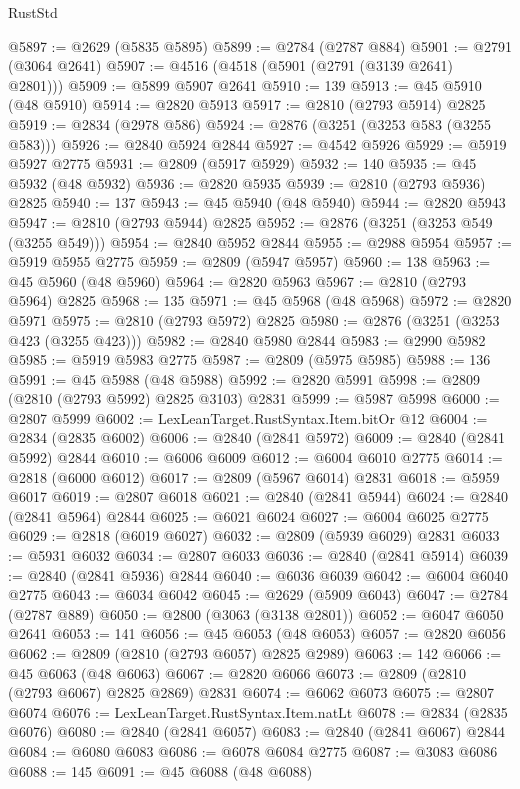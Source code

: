 \begin{lexlean}{RustStd}
\begin{coremodule}
@5897 := @2629 (@5835 @5895)
@5899 := @2784 (@2787 @884)
@5901 := @2791 (@3064 @2641)
@5907 := @4516 (@4518 (@5901 (@2791 (@3139 @2641) @2801)))
@5909 := @5899 @5907 @2641
@5910 := 139
@5913 := @45 @5910 (@48 @5910)
@5914 := @2820 @5913
@5917 := @2810 (@2793 @5914) @2825
@5919 := @2834 (@2978 @586)
@5924 := @2876 (@3251 (@3253 @583 (@3255 @583)))
@5926 := @2840 @5924 @2844
@5927 := @4542 @5926
@5929 := @5919 @5927 @2775
@5931 := @2809 (@5917 @5929)
@5932 := 140
@5935 := @45 @5932 (@48 @5932)
@5936 := @2820 @5935
@5939 := @2810 (@2793 @5936) @2825
@5940 := 137
@5943 := @45 @5940 (@48 @5940)
@5944 := @2820 @5943
@5947 := @2810 (@2793 @5944) @2825
@5952 := @2876 (@3251 (@3253 @549 (@3255 @549)))
@5954 := @2840 @5952 @2844
@5955 := @2988 @5954
@5957 := @5919 @5955 @2775
@5959 := @2809 (@5947 @5957)
@5960 := 138
@5963 := @45 @5960 (@48 @5960)
@5964 := @2820 @5963
@5967 := @2810 (@2793 @5964) @2825
@5968 := 135
@5971 := @45 @5968 (@48 @5968)
@5972 := @2820 @5971
@5975 := @2810 (@2793 @5972) @2825
@5980 := @2876 (@3251 (@3253 @423 (@3255 @423)))
@5982 := @2840 @5980 @2844
@5983 := @2990 @5982
@5985 := @5919 @5983 @2775
@5987 := @2809 (@5975 @5985)
@5988 := 136
@5991 := @45 @5988 (@48 @5988)
@5992 := @2820 @5991
@5998 := @2809 (@2810 (@2793 @5992) @2825 @3103) @2831
@5999 := @5987 @5998
@6000 := @2807 @5999
@6002 := LexLeanTarget.RustSyntax.Item.bitOr @12
@6004 := @2834 (@2835 @6002)
@6006 := @2840 (@2841 @5972)
@6009 := @2840 (@2841 @5992) @2844
@6010 := @6006 @6009
@6012 := @6004 @6010 @2775
@6014 := @2818 (@6000 @6012)
@6017 := @2809 (@5967 @6014) @2831
@6018 := @5959 @6017
@6019 := @2807 @6018
@6021 := @2840 (@2841 @5944)
@6024 := @2840 (@2841 @5964) @2844
@6025 := @6021 @6024
@6027 := @6004 @6025 @2775
@6029 := @2818 (@6019 @6027)
@6032 := @2809 (@5939 @6029) @2831
@6033 := @5931 @6032
@6034 := @2807 @6033
@6036 := @2840 (@2841 @5914)
@6039 := @2840 (@2841 @5936) @2844
@6040 := @6036 @6039
@6042 := @6004 @6040 @2775
@6043 := @6034 @6042
@6045 := @2629 (@5909 @6043)
@6047 := @2784 (@2787 @889)
@6050 := @2800 (@3063 (@3138 @2801))
@6052 := @6047 @6050 @2641
@6053 := 141
@6056 := @45 @6053 (@48 @6053)
@6057 := @2820 @6056
@6062 := @2809 (@2810 (@2793 @6057) @2825 @2989)
@6063 := 142
@6066 := @45 @6063 (@48 @6063)
@6067 := @2820 @6066
@6073 := @2809 (@2810 (@2793 @6067) @2825 @2869) @2831
@6074 := @6062 @6073
@6075 := @2807 @6074
@6076 := LexLeanTarget.RustSyntax.Item.natLt
@6078 := @2834 (@2835 @6076)
@6080 := @2840 (@2841 @6057)
@6083 := @2840 (@2841 @6067) @2844
@6084 := @6080 @6083
@6086 := @6078 @6084 @2775
@6087 := @3083 @6086
@6088 := 145
@6091 := @45 @6088 (@48 @6088)

\end{coremodule}
\end{lexlean}
